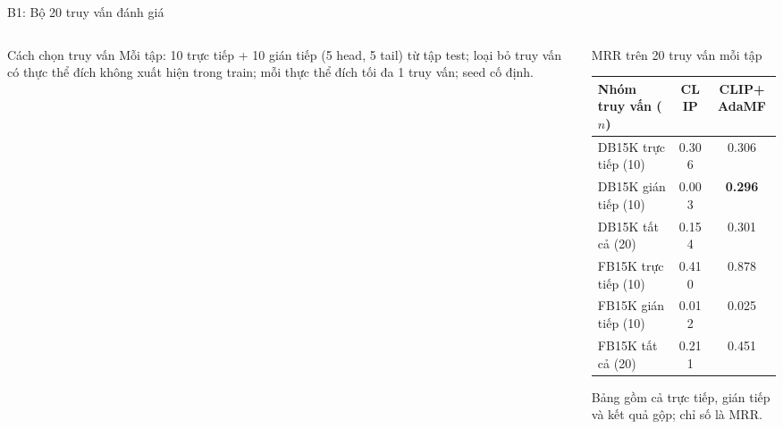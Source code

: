 \documentclass[aspectratio=169,10pt]{beamer}
\newcounter{backupslide}
\begin{document}
\begin{frame}[noframenumbering]{B1: Bộ 20 truy vấn đánh giá}
  \begin{columns}[t]
    \begin{column}{0.50\textwidth}
      \begin{block}{Cách chọn truy vấn}\footnotesize
        Mỗi tập: 10 trực tiếp + 10 gián tiếp (5 head, 5 tail) từ tập test; loại bỏ truy vấn có thực thể đích không xuất hiện trong train; mỗi thực thể đích tối đa 1 truy vấn; seed cố định.
      \end{block}
      \vspace{0.15cm}

      \vspace{0.15cm}
    \end{column}
    \begin{column}{0.48\textwidth}
      \begin{block}{MRR trên 20 truy vấn mỗi tập}\footnotesize
        \centering
        \begin{tabular}{@{}lcc@{}}
          \toprule
          Nhóm truy vấn ($n$) & CLIP & CLIP+AdaMF\\
          \midrule
          DB15K trực tiếp (10) & 0.306 & 0.306\\
          DB15K gián tiếp (10) & 0.003 & \textbf{0.296}\\
          DB15K tất cả (20) & 0.154 & 0.301\\
          \midrule
          FB15K trực tiếp (10) & 0.410 & 0.878\\
          FB15K gián tiếp (10) & 0.012 & 0.025\\
          FB15K tất cả (20) & 0.211 & 0.451\\
          \bottomrule
        \end{tabular}
      \end{block}
      \vspace{0.1cm}
      {\footnotesize Bảng gồm cả trực tiếp, gián tiếp và kết quả gộp; chỉ số là MRR.}
    \end{column}
  \end{columns}
\end{frame}
\end{document}
